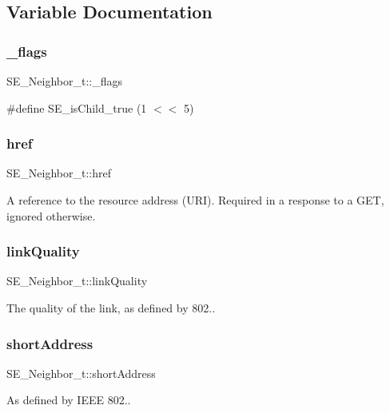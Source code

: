 \subsection{Variable Documentation}
\mbox{\label{group__Neighbor_ga0518ed6ff88d279fae8395c91ddbb35f}} 
\subsubsection{\texorpdfstring{\+\_\+flags}{\_flags}}
{\footnotesize\ttfamily S\+E\+\_\+\+Neighbor\+\_\+t\+::\+\_\+flags}

\#define S\+E\+\_\+is\+Child\+\_\+true (1 $<$$<$ 5) \mbox{\label{group__Neighbor_gad4838ad5ed4427be8519b653f9bf1d19}} 
\subsubsection{\texorpdfstring{href}{href}}
{\footnotesize\ttfamily S\+E\+\_\+\+Neighbor\+\_\+t\+::href}

A reference to the resource address (U\+RI). Required in a response to a G\+ET, ignored otherwise. \mbox{\label{group__Neighbor_gab26edd9f3b909788d724f45d6d7cd831}} 
\subsubsection{\texorpdfstring{link\+Quality}{linkQuality}}
{\footnotesize\ttfamily S\+E\+\_\+\+Neighbor\+\_\+t\+::link\+Quality}

The quality of the link, as defined by 802.. \mbox{\label{group__Neighbor_ga76779342274466f668ade7f1d80148ae}} 
\subsubsection{\texorpdfstring{short\+Address}{shortAddress}}
{\footnotesize\ttfamily S\+E\+\_\+\+Neighbor\+\_\+t\+::short\+Address}

As defined by I\+E\+EE 802.. 